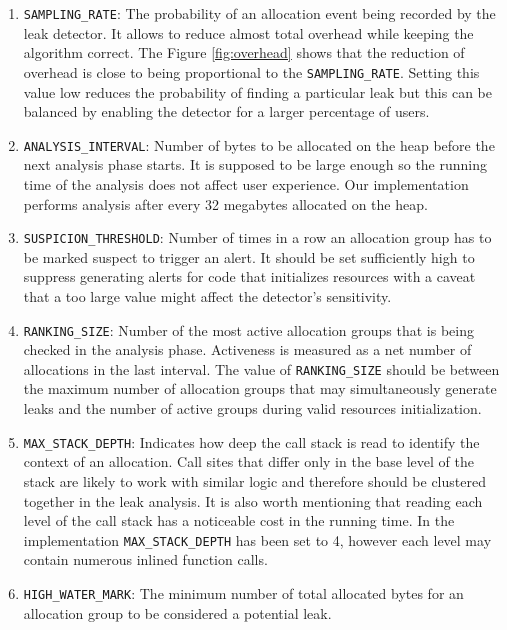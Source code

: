 \documentclass[preprint, numbers]{sigplanconf}
\begin{document}
\begin{enumerate}

\item \texttt{SAMPLING\_RATE}: The probability of an allocation
	event being recorded by the leak detector.
	It allows to reduce almost total overhead while keeping the algorithm correct.
	The Figure \ref{fig:overhead} shows that the reduction of overhead is close
	to being proportional to the \texttt{SAMPLING\_RATE}.
	Setting this value low reduces the probability of finding a particular leak
	but this can be balanced by enabling the detector for a larger percentage of users.

\item \texttt{ANALYSIS\_INTERVAL}: Number of bytes to be allocated on the heap before the next
	analysis phase starts.
	It is supposed to be large enough so the running time of the analysis does not
	affect user experience.
	Our implementation performs analysis after every 32 megabytes allocated
	on the heap.

\item \texttt{SUSPICION\_THRESHOLD}: Number of times in a row an allocation group
	has to be marked suspect to trigger an alert.
	It should be set sufficiently high to suppress generating alerts for code that initializes resources
	with a caveat that a too large value might affect the detector's sensitivity.

\item \texttt{RANKING\_SIZE}: Number of the most active allocation groups
	that is being checked in the analysis phase.
	Activeness is measured as a net number of allocations in the last interval.
	The value of \texttt{RANKING\_SIZE} should be between the maximum number
	of allocation groups that may simultaneously generate leaks and the
	number of active groups during valid resources initialization.

\item \texttt{MAX\_STACK\_DEPTH}: Indicates how deep the call stack is read to
	identify the context of an allocation.
	Call sites that differ only in the base level of the stack are likely to
	work with similar logic and therefore should be clustered together
	in the leak analysis.
	It is also worth mentioning that reading each level of the call stack
	has a noticeable cost in the running time.
	In the implementation \texttt{MAX\_STACK\_DEPTH} has been set to 4,
	however each level may contain numerous inlined function calls.

\item \texttt{HIGH\_WATER\_MARK}: The minimum number of total allocated bytes for an
	allocation group to be considered a potential leak.

\end{enumerate}
\end{document}
